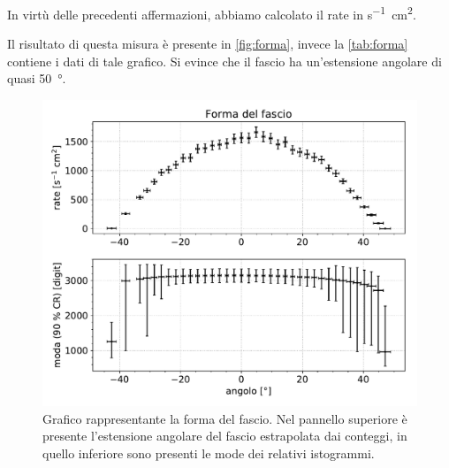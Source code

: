 
In virtù delle precedenti affermazioni, abbiamo calcolato il rate in \si{s^{-1}cm^2}.

Il risultato di questa misura è presente in \autoref{fig:forma}, invece la \autoref{tab:forma} contiene i dati di tale grafico.
Si evince che il fascio ha un'estensione angolare di quasi \SI{50}{\degree}. 

\begin{figure}[h]
\centering
\includegraphics[width=30 em]{immagini/forma}
\caption{Grafico rappresentante la forma del fascio. Nel pannello superiore è presente l'estensione angolare del fascio estrapolata dai conteggi, in quello inferiore sono presenti le mode dei relativi istogrammi.}
\label{fig:forma}
\end{figure}

